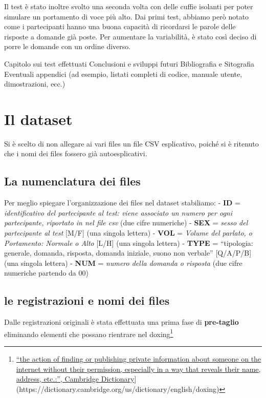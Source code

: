 \documentclass[
]{article}
\begin{document}
Il test è stato inoltre svolto una seconda volta con delle cuffie isolanti per poter simulare un portamento di voce più alto. Dai primi test, abbiamo però notato come i partecipanti hanno una buona capacità di ricordarsi le parole delle risposte a domande già poste. Per aumentare la variabilità, è stato così deciso di porre le domande con un ordine diverso.

Capitolo sui test effettuati Conclusioni e sviluppi futuri Bibliografia e Sitografia Eventuali appendici (ad esempio, listati completi di codice, manuale utente, dimostrazioni, ecc.)

\section{Il dataset}\label{il-dataset}

Si è scelto di non allegare ai vari files un file CSV esplicativo, poiché si è ritenuto che i nomi dei files fossero già autoesplicativi.

\subsection{La numenclatura dei files}\label{la-numenclatura-dei-files}

Per meglio spiegare l'organizzazione dei files nel dataset stabiliamo: - \textbf{ID} = \emph{identificativo del partecipante al test: viene associato un numero per ogni partecipante, riportato in nel file csv} (due cifre numeriche) - \textbf{SEX} = \emph{sesso del partecipante al test} {[}M/F{]} (una singola lettera) - \textbf{VOL} = \emph{Volume del parlato, o Portamento: Normale o Alto} {[}L/H{]} (una singola lettera) - \textbf{TYPE} = ``tipologia: generale, domanda, risposta, domanda iniziale, suono non verbale'' {[}Q/A/P/B{]} (una singola lettera) - \textbf{NUM} = \emph{numero della domanda o risposta} (due cifre numeriche partendo da 00)

\subsection{le registrazioni e nomi dei files}\label{le-registrazioni-e-nomi-dei-files}

Dalle registrazioni originali è stata effettuata una prima fase di \textbf{pre-taglio} eliminando elementi che possano rientrare nel doxing\footnote{\href{\%5Bhttps://www.}{``the action of finding or publishing private information about someone on the internet without their permission, especially in a way that reveals their name, address, etc.:'', Cambridge Dictionary}{]}(https://dictionary.cambridge.org/us/dictionary/english/doxing)}
\end{document}
